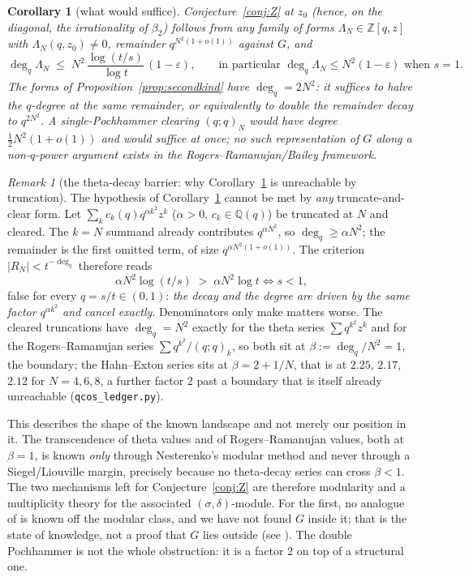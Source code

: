 \documentclass[11pt]{article}
\theoremstyle{plain}
\newtheorem{corollary}[theorem]{Corollary}
\theoremstyle{definition}
\theoremstyle{remark}
\newtheorem{remark}[theorem]{Remark}
\newcommand{\Z}{\mathbb{Z}}
\newcommand{\Q}{\mathbb{Q}}
\begin{document}
\begin{corollary}[what would suffice]\label{cor:suffices}
Conjecture~\ref{conj:Z} at $z_0$ (hence, on the diagonal, the irrationality of $\beta_2$) follows
from any family of forms $\Lambda_N\in\Z[q,z]$ with $\Lambda_N(q,z_0)\ne0$, remainder
$q^{N^2(1+o(1))}$ against $G$, and
\[
   \deg_q\Lambda_N\;\le\;N^2\,\frac{\log(t/s)}{\log t}\,(1-\varepsilon),
   \qquad\text{in particular }\deg_q\Lambda_N\le N^2(1-\varepsilon)\text{ when }s=1 .
\]
The forms of Proposition~\ref{prop:secondkind} have $\deg_q=2N^2$: it suffices to \emph{halve} the
$q$-degree at the same remainder, or equivalently to double the remainder decay to $q^{2N^2}$. A
single-Pochhammer clearing $(q;q)_N$ would have degree $\tfrac12N^2(1+o(1))$ and would suffice at once;
no such representation of $G$ along a non-$q$-power argument exists in the
Rogers--Ramanujan/Bailey framework.
\end{corollary}

\begin{remark}[the theta-decay barrier: why Corollary~\ref{cor:suffices} is unreachable by truncation]
\label{rem:thetabarrier}
The hypothesis of Corollary~\ref{cor:suffices} cannot be met by \emph{any} truncate-and-clear form.
Let $\sum_kc_k(q)q^{\alpha k^2}z^k$ ($\alpha>0$, $c_k\in\Q(q)$) be truncated at $N$ and cleared. The
$k=N$ summand already contributes $q^{\alpha N^2}$, so $\deg_q\ge\alpha N^2$; the remainder is the
first omitted term, of size $q^{\alpha N^2(1+o(1))}$. The criterion $|R_N|<t^{-\deg_q}$ therefore reads
\[
   \alpha N^2\log(t/s)\;>\;\alpha N^2\log t\iff s<1,
\]
false for every $q=s/t\in(0,1)$: \emph{the decay and the degree are driven by the same factor
$q^{\alpha k^2}$ and cancel exactly}. Denominators only make matters worse. The cleared truncations
have $\deg_q=N^2$ exactly for the theta series $\sum q^{k^2}z^k$ and for the Rogers--Ramanujan
series $\sum q^{k^2}/(q;q)_k$, so both sit at $\beta:=\deg_q/N^2=1$, the boundary; the Hahn--Exton
series sits at $\beta=2+1/N$, that is at $2.25$, $2.17$, $2.12$ for $N=4,6,8$, a further factor $2$
past a boundary that is itself already unreachable (\texttt{qcos\_ledger.py}).

This describes the shape of the known landscape and not merely our position in it. The
transcendence of theta values and of Rogers--Ramanujan values, both at $\beta=1$, is known
\emph{only} through Nesterenko's modular method \cite{Nesterenko} and never through a
Siegel/Liouville margin, precisely because no theta-decay series can cross $\beta<1$. The two
mechanisms left for Conjecture~\ref{conj:Z} are therefore modularity and a multiplicity theory for
the associated $(\sigma,\delta)$-module. For the first, no analogue of \cite{Nesterenko} is known
off the modular class, and we have not found $G$ inside it; that is the state of knowledge, not a
proof that $G$ lies outside (see \cite{Bonfioli2}). The double Pochhammer is not the whole
obstruction: it is a factor $2$ on top of a structural one.
\end{remark}
\end{document}

